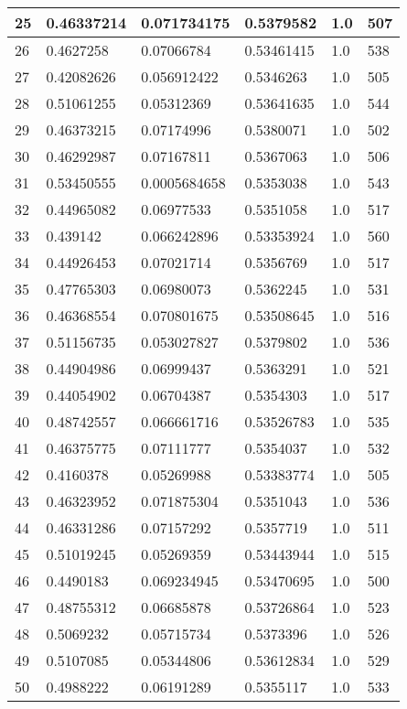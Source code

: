 \begin{longtable}{|l|l|l|l|l|l|}
25 & 0.46337214 & 0.071734175 & 0.5379582 & 1.0 & 507 \\ \hline 
26 & 0.4627258 & 0.07066784 & 0.53461415 & 1.0 & 538 \\ \hline 
27 & 0.42082626 & 0.056912422 & 0.5346263 & 1.0 & 505 \\ \hline 
28 & 0.51061255 & 0.05312369 & 0.53641635 & 1.0 & 544 \\ \hline 
29 & 0.46373215 & 0.07174996 & 0.5380071 & 1.0 & 502 \\ \hline 
30 & 0.46292987 & 0.07167811 & 0.5367063 & 1.0 & 506 \\ \hline 
31 & 0.53450555 & 0.0005684658 & 0.5353038 & 1.0 & 543 \\ \hline 
32 & 0.44965082 & 0.06977533 & 0.5351058 & 1.0 & 517 \\ \hline 
33 & 0.439142 & 0.066242896 & 0.53353924 & 1.0 & 560 \\ \hline 
34 & 0.44926453 & 0.07021714 & 0.5356769 & 1.0 & 517 \\ \hline 
35 & 0.47765303 & 0.06980073 & 0.5362245 & 1.0 & 531 \\ \hline 
36 & 0.46368554 & 0.070801675 & 0.53508645 & 1.0 & 516 \\ \hline 
37 & 0.51156735 & 0.053027827 & 0.5379802 & 1.0 & 536 \\ \hline 
38 & 0.44904986 & 0.06999437 & 0.5363291 & 1.0 & 521 \\ \hline 
39 & 0.44054902 & 0.06704387 & 0.5354303 & 1.0 & 517 \\ \hline 
40 & 0.48742557 & 0.066661716 & 0.53526783 & 1.0 & 535 \\ \hline 
41 & 0.46375775 & 0.07111777 & 0.5354037 & 1.0 & 532 \\ \hline 
42 & 0.4160378 & 0.05269988 & 0.53383774 & 1.0 & 505 \\ \hline 
43 & 0.46323952 & 0.071875304 & 0.5351043 & 1.0 & 536 \\ \hline 
44 & 0.46331286 & 0.07157292 & 0.5357719 & 1.0 & 511 \\ \hline 
45 & 0.51019245 & 0.05269359 & 0.53443944 & 1.0 & 515 \\ \hline 
46 & 0.4490183 & 0.069234945 & 0.53470695 & 1.0 & 500 \\ \hline 
47 & 0.48755312 & 0.06685878 & 0.53726864 & 1.0 & 523 \\ \hline 
48 & 0.5069232 & 0.05715734 & 0.5373396 & 1.0 & 526 \\ \hline 
49 & 0.5107085 & 0.05344806 & 0.53612834 & 1.0 & 529 \\ \hline 
50 & 0.4988222 & 0.06191289 & 0.5355117 & 1.0 & 533 \\ \hline 
\end{longtable}